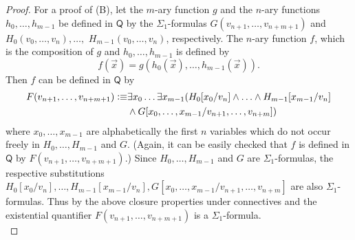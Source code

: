 \begin{proof}
For a proof of (B), let the $m$-ary function $g$ and the $n$-ary functions $h_0, \ldots, h_{m-1}$ be defined in $\mathsf{Q}$ by the $\Sigma_1$-formulas $G(v_{n+1}, \ldots, v_{n+m+1})$ and \sloppy$H_0(v_0, \ldots, v_{n}), \ldots,$ $H_{m-1}(v_0, \ldots, v_{n})$, respectively. The $n$-ary function $f$,  which is the composition of $g$ and $h_0, \ldots, h_{m-1}$ is defined by
\[f(\overrightarrow{x}) = g(h_0(\overrightarrow{x}), \ldots, h_{m-1}(\overrightarrow{x})).\] Then $f$ can be defined in $\mathsf{Q}$ by 
\begin{align*}
F(v_{n+1},\ldots, v_{n+m+1}) \vcentcolon \equiv & \exists x_{0} \ldots \exists x_{m-1}  (H_0 [x_0/v_{n}] \wedge \ldots \wedge H_{m-1} [x_{m-1}/v_{n}] \\
&  \wedge  G[x_0, \ldots,  x_{m-1}/v_{n+1}, \ldots, v_{n+m}])
\end{align*}
where $x_0, \ldots, x_{m-1}$ are alphabetically the first $n$ variables which do not occur freely in $H_0, \ldots, H_{m-1}$ and $G$. (Again, it can be easily checked that $f$ is defined in $\mathsf{Q}$ by $F(v_{n+1},\ldots, v_{n+m+1})$.) Since $H_0, \ldots, H_{m-1}$ and $G$ are $\Sigma_1$-formulas, the respective substitutions $H_0 [x_0/v_{n}], \ldots ,H_{m-1} [x_{m-1}/v_{n}], G[x_0, \ldots,  x_{m-1}/v_{n+1}, \ldots, v_{n+m}]$ are also $\Sigma_1$-formulas. Thus by the above closure properties under connectives and the existential quantifier $F(v_{n+1},\ldots, v_{n+m+1})$ is a $\Sigma_1$-formula.
\\


\end{proof}
